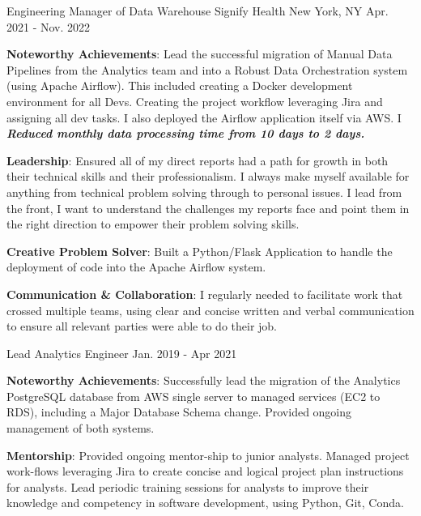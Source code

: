 \begin{cventries}
  \cventry
    {Engineering Manager of Data Warehouse}
    {Signify Health}
    {New York, NY}
    {Apr. 2021 - Nov. 2022}
    {
      \begin{cvitems}
           \item {\textbf{Noteworthy Achievements}: Lead the successful migration of Manual Data Pipelines from the Analytics team and into a Robust Data Orchestration system (using Apache Airflow). This included creating a Docker development environment for all Devs. Creating the project workflow leveraging Jira and assigning all dev tasks. I also deployed the Airflow application itself via AWS. I \textbf{\emph{Reduced monthly data processing time from 10 days to 2 days.}}
          \item {\textbf{Leadership}: Ensured all of my direct reports had a path for growth in both their technical skills and their professionalism. I always make myself available for anything from technical problem solving through to personal issues. I lead from the front, I want to understand the challenges my reports face and point them in the right direction to empower their problem solving skills.}
          \item {\textbf{Creative Problem Solver}: Built a Python/Flask Application to handle the deployment of code into the Apache Airflow system.}
          \item {\textbf{Communication \& Collaboration}}: I regularly needed to facilitate work that crossed multiple teams, using clear and concise written and verbal communication to ensure all relevant parties were able to do their job.}
      \end{cvitems}
    }
  \cventry
    {Lead Analytics Engineer}
    {}
    {}
    {Jan. 2019 - Apr 2021}
    {
      \begin{cvitems}
          \item {\textbf{Noteworthy Achievements}: Successfully lead the migration of the Analytics PostgreSQL database from AWS single server to managed services (EC2 to RDS), including a Major Database Schema change. Provided ongoing management of both systems.}
          \item {\textbf{Mentorship}: Provided ongoing mentor-ship to junior analysts. Managed project work-flows leveraging Jira to create concise and logical project plan instructions for analysts. Lead periodic training sessions for analysts to improve their knowledge and competency in software development, using Python, Git, Conda.}

\end{cvitems}}
\end{cventries}
